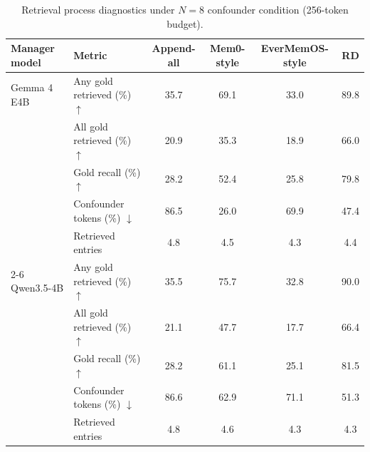 \begin{table}[t]
\centering
\caption{Retrieval process diagnostics under $N=8$ confounder condition (256-token budget).}
\label{tab:retrieval_diagnostics}
\small
\begin{tabular}{llcccc}
\toprule
Manager model & Metric & Append-all & Mem0-style & EverMemOS-style & RD \\
\midrule
Gemma 4 E4B & Any gold retrieved (\%) $\uparrow$ & 35.7 & 69.1 & 33.0 & 89.8 \\
 & All gold retrieved (\%) $\uparrow$ & 20.9 & 35.3 & 18.9 & 66.0 \\
 & Gold recall (\%) $\uparrow$ & 28.2 & 52.4 & 25.8 & 79.8 \\
 & Confounder tokens (\%) $\downarrow$ & 86.5 & 26.0 & 69.9 & 47.4 \\
 & Retrieved entries & 4.8 & 4.5 & 4.3 & 4.4 \\
\cmidrule{2-6}
Qwen3.5-4B & Any gold retrieved (\%) $\uparrow$ & 35.5 & 75.7 & 32.8 & 90.0 \\
 & All gold retrieved (\%) $\uparrow$ & 21.1 & 47.7 & 17.7 & 66.4 \\
 & Gold recall (\%) $\uparrow$ & 28.2 & 61.1 & 25.1 & 81.5 \\
 & Confounder tokens (\%) $\downarrow$ & 86.6 & 62.9 & 71.1 & 51.3 \\
 & Retrieved entries & 4.8 & 4.6 & 4.3 & 4.3 \\
\bottomrule
\end{tabular}
\end{table}
